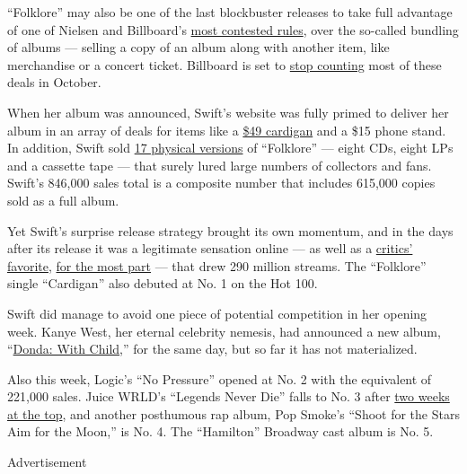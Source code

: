 ``Folklore'' may also be one of the last blockbuster releases to take
full advantage of one of Nielsen and Billboard's
\href{https://www.nytimes3xbfgragh.onion/2019/06/09/business/media/billboard-charts-bundles.html}{most
contested rules}, over the so-called bundling of albums --- selling a
copy of an album along with another item, like merchandise or a concert
ticket. Billboard is set to
\href{https://www.nytimes3xbfgragh.onion/2020/07/14/arts/music/billboard-ticket-merchandise-bundles.html}{stop
counting} most of these deals in October.

When her album was announced, Swift's website was fully primed to
deliver her album in an array of deals for items like a
\href{https://twitter.com/bybrianbyrne/status/1289312401360187392}{\$49
cardigan} and a \$15 phone stand. In addition, Swift sold
\href{https://www.nytimes3xbfgragh.onion/2020/07/27/arts/music/juice-wrld-taylor-swift-billboard.html}{17
physical versions} of ``Folklore'' --- eight CDs, eight LPs and a
cassette tape --- that surely lured large numbers of collectors and
fans. Swift's 846,000 sales total is a composite number that includes
615,000 copies sold as a full album.

Yet Swift's surprise release strategy brought its own momentum, and in
the days after its release it was a legitimate sensation online --- as
well as a
\href{https://www.metacritic.com/music/folklore/taylor-swift}{critics'
favorite},
\href{https://www.nytimes3xbfgragh.onion/2020/07/26/arts/music/taylor-swift-folklore-review.html}{for
the most part} --- that drew 290 million streams. The ``Folklore''
single ``Cardigan'' also debuted at No. 1 on the Hot 100.

Swift did manage to avoid one piece of potential competition in her
opening week. Kanye West, her eternal celebrity nemesis, had announced a
new album,
``\href{https://www.nytimes3xbfgragh.onion/2020/07/23/arts/music/taylor-swift-kanye-west.html}{Donda:
With Child},'' for the same day, but so far it has not materialized.

Also this week, Logic's ``No Pressure'' opened at No. 2 with the
equivalent of 221,000 sales. Juice WRLD's ``Legends Never Die'' falls to
No. 3 after
\href{https://www.nytimes3xbfgragh.onion/2020/07/27/arts/music/juice-wrld-taylor-swift-billboard.html}{two
weeks at the top}, and another posthumous rap album, Pop Smoke's ``Shoot
for the Stars Aim for the Moon,'' is No. 4. The ``Hamilton'' Broadway
cast album is No. 5.

Advertisement

